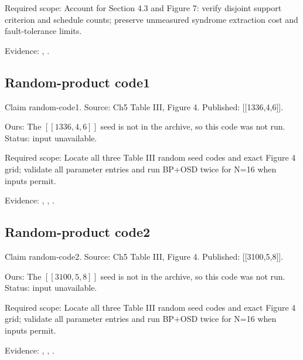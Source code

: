 Required scope: Account for Section 4.3 and Figure 7: verify disjoint support criterion and schedule counts; preserve unmeasured syndrome extraction cost and fault-tolerance limits.

Evidence: \href{https://github.com/alectionary/vibe-math/blob/master/formalization/quintavalle-hgp/sources/browser-extraction.txt}{}, \href{https://github.com/alectionary/vibe-math/blob/master/formalization/quintavalle-hgp/availability.md}{}.
\subsection{Random-product code1}\label{claim:random-code1}
Claim random-code1. Source: Ch5 Table III, Figure 4. Published: [[1336,4,6]].

Ours: The $[[1336,4,6]]$ seed is not in the archive, so this code was not run. Status: input unavailable.

Required scope: Locate all three Table III random seed codes and exact Figure 4 grid; validate all parameter entries and run BP+OSD twice for N=16 when inputs permit.

Evidence: \href{https://github.com/alectionary/vibe-math/blob/master/formalization/quintavalle-hgp/sources/browser-extraction.txt}{}, \href{https://github.com/alectionary/vibe-math/blob/master/formalization/quintavalle-hgp/availability.md}{}, \href{https://github.com/alectionary/vibe-math/blob/master/formalization/quintavalle-hgp/results/original_pilots.json}{}.
\subsection{Random-product code2}\label{claim:random-code2}
Claim random-code2. Source: Ch5 Table III, Figure 4. Published: [[3100,5,8]].

Ours: The $[[3100,5,8]]$ seed is not in the archive, so this code was not run. Status: input unavailable.

Required scope: Locate all three Table III random seed codes and exact Figure 4 grid; validate all parameter entries and run BP+OSD twice for N=16 when inputs permit.

Evidence: \href{https://github.com/alectionary/vibe-math/blob/master/formalization/quintavalle-hgp/sources/browser-extraction.txt}{}, \href{https://github.com/alectionary/vibe-math/blob/master/formalization/quintavalle-hgp/availability.md}{}, \href{https://github.com/alectionary/vibe-math/blob/master/formalization/quintavalle-hgp/results/original_pilots.json}{}.
